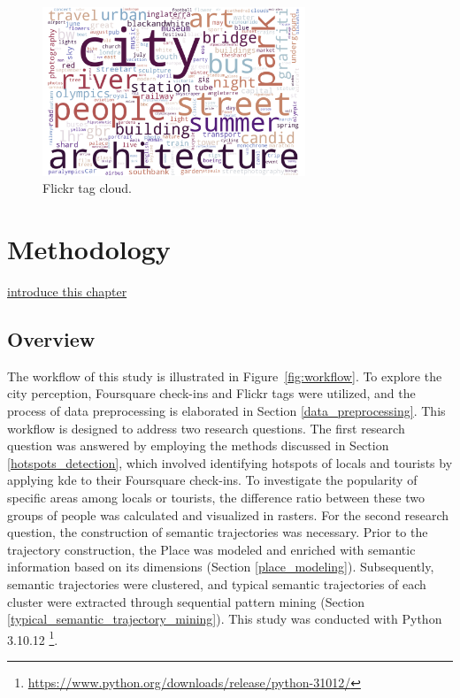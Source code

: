 \documentclass{article}
\theoremstyle{definition}
\theoremstyle{remark}
\begin{document}
\begin{figure}[h!]
\centering
\includegraphics[width=0.7\textwidth]{figures/flickr_tag_cloud.png}
\caption{\label{fig:flickr_tag_cloud}Flickr tag cloud.}
\end{figure}


\clearpage


\section{Methodology}
\underline{introduce this chapter}

\subsection{Overview}
The workflow of this study is illustrated in Figure~\ref{fig:workflow}. To explore the city perception, Foursquare check-ins and Flickr tags were utilized, and the process of data preprocessing is elaborated in Section \ref{data_preprocessing}. This workflow is designed to address two research questions. The first research question was answered by employing the methods discussed in Section \ref{hotspots_detection}, which involved identifying hotspots of locals and tourists by applying \acrfull{kde} to their Foursquare check-ins. To investigate the popularity of specific areas among locals or tourists, the difference ratio between these two groups of people was calculated and visualized in rasters. For the second research question, the construction of semantic trajectories was necessary. Prior to the trajectory construction, the Place was modeled and enriched with semantic information based on its dimensions (Section \ref{place_modeling}). Subsequently, semantic trajectories were clustered, and typical semantic trajectories of each cluster were extracted through sequential pattern mining (Section \ref{typical_semantic_trajectory_mining}). This study was conducted with Python 3.10.12 \footnote{\url{https://www.python.org/downloads/release/python-31012/}}.
\end{document}
